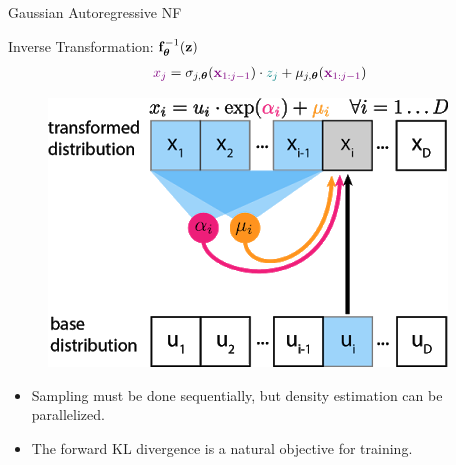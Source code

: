 \documentclass{beamer}
\begin{document}
\begin{frame}{Gaussian Autoregressive NF}
\begin{minipage}[t]{0.65\columnwidth}
\begin{block}{Inverse Transformation: $\mathbf{f}^{-1}_{\boldsymbol{\theta}}(\mathbf{z})$}
\begin{align*}
				{\color{violet} x_j} &= \sigma_{j, \boldsymbol{\theta}} ({\color{violet} \mathbf{x}_{1:j-1}}) \cdot {\color{teal} z_j} + \mu_{j, \boldsymbol{\theta}}({\color{violet} \mathbf{x}_{1:j-1}}) \\
			\end{align*}
			\vspace{-0.3cm}
		\end{block}
	\end{minipage}%
	\begin{minipage}[t]{0.35\columnwidth}
		\begin{figure}[h]
			\centering
			\includegraphics[width=.9\linewidth]{figs/af_iaf_explained_1.png}
		\end{figure}
	\end{minipage}	
	\vspace{-0.7cm}
	\eqpause
	\begin{itemize}
		\item Sampling must be done sequentially, but density estimation can be parallelized.
		\item The forward KL divergence is a natural objective for training.
	\end{itemize}
\end{frame}
\end{document}
